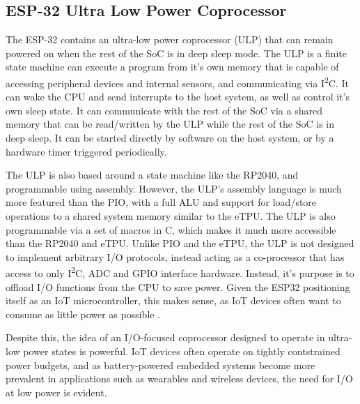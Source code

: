 \subsection{ESP-32 Ultra Low Power Coprocessor}

The ESP-32 contains an ultra-low power coprocessor (ULP) that can remain powered on when the rest of the SoC is in deep sleep mode. The ULP is a finite state machine can execute a program from it's own memory that is capable of accessing peripheral devices and internal sensors, and communicating via I\textsuperscript{2}C. It can wake the CPU and send interrupts to the host system, as well as control it's own sleep state. It can communicate with the rest of the SoC via a shared memory that can be read/written by the ULP while the rest of the SoC is in deep sleep. It can be started directly by software on the host system, or by a hardware timer triggered periodically.

The ULP is also based around a state machine like the RP2040, and programmable using assembly. However, the ULP's assembly language is much more featured than the PIO, with a full ALU and support for load/store operations to a shared system memory similar to the eTPU. The ULP is also programmable via a set of macros in C, which makes it much more accessible than the RP2040 and eTPU. Unlike PIO and the eTPU, the ULP is not designed to implement arbitrary I/O protocols, instead acting as a co-processor that has access to only I\textsuperscript{2}C, ADC and GPIO interface hardware. Instead, it's purpose is to offload I/O functions from the CPU to save power. Given the ESP32 positioning itself as an IoT microcontroller, this makes sense, as IoT devices often want to consume as little power as possible \cite{esp32}.

Despite this, the idea of an I/O-focused coprocessor designed to operate in ultra-low power states is powerful. IoT devices often operate on tightly contstrained power budgets, and as battery-powered embedded systems become more prevalent in applications such as wearables and wireless devices, the need for I/O at low power is evident.


